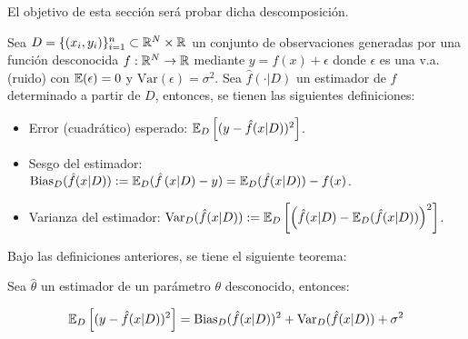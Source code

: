 El objetivo de esta sección será probar dicha descomposición.

\begin{definition}
	Sea $D=\{(x_i,y_i)\}_{i=1}^n\subset{\mathbb R}^N\times{\mathbb R}$ un conjunto de observaciones generadas por una función desconocida $f:{\mathbb R}^N\to{\mathbb R}$ mediante $y=f(x)+\epsilon$ donde $\epsilon$ es una v.a. (ruido) con $\operatorname{\mathbb{E}}(\epsilon)=0$ y $\text{Var}(\epsilon)=\sigma^2$. Sea $\hat{f}(\cdot|D)$ un estimador de $f$ determinado a partir de $D$, entonces, se tienen las siguientes definiciones:
	
	\begin{itemize}
		\item Error (cuadrático) esperado: $\operatorname{\mathbb{E}}_D\left[(y-\hat{f}(x|D))^2\right]$.
		\item Sesgo del estimador: $\text{Bias}_D(\hat{f}(x|D)):=\operatorname{\mathbb{E}}_D(\hat{f}\left(x|D) - y\right) = \operatorname{\mathbb{E}}_D(\hat{f}(x|D)) - f(x)$.
		\item Varianza del estimador: $\text{Var}_D(\hat{f}(x|D)) := \operatorname{\mathbb{E}}_D\left[\left(\hat{f}(x|D)-\operatorname{\mathbb{E}}_D(\hat{f}(x|D))\right)^2\right]$.
		
	\end{itemize}
\end{definition}

Bajo las definiciones anteriores, se tiene el siguiente teorema:

\begin{theorem} Sea $\hat{\theta}$ un estimador de un parámetro $\theta$ desconocido, entonces:

\begin{equation}
	\operatorname{\mathbb{E}}_D\left[(y-\hat{f}(x|D))^2\right] = \text{Bias}_D(\hat{f}(x|D))^2 + \text{Var}_D(\hat{f}(x|D)) + \sigma^2
\end{equation}
	
\end{theorem}

